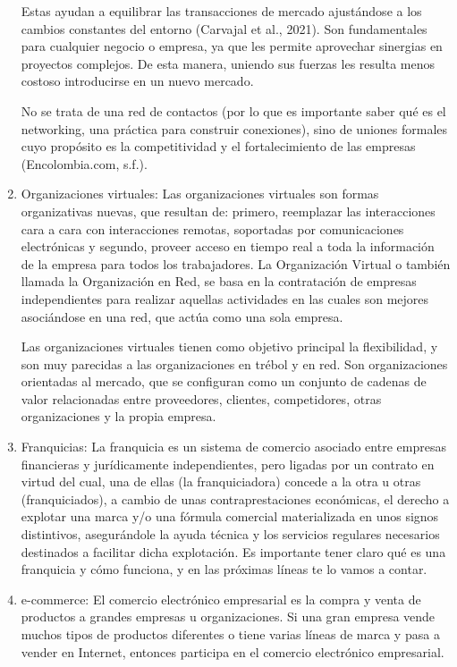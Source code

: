 \documentclass[letterpaper,12pt]{article}
\begin{document}
\begin{sloppypar}
\begin{enumerate}
    Estas ayudan a equilibrar las transacciones de mercado ajustándose a los cambios constantes del entorno (Carvajal et al., 2021). Son fundamentales para cualquier negocio o empresa, ya que les permite aprovechar sinergias en proyectos complejos. De esta manera, uniendo sus fuerzas les resulta menos costoso introducirse en un nuevo mercado. 
    
    No se trata de una red de contactos (por lo que es importante saber qué es el networking, una práctica para construir conexiones), sino de uniones formales cuyo propósito es la competitividad y el fortalecimiento de las empresas (Encolombia.com, s.f.).

    \item Organizaciones virtuales:  Las organizaciones virtuales son formas organizativas nuevas, que resultan de: primero,
    reemplazar las interacciones cara a cara con interacciones remotas, soportadas por
    comunicaciones electrónicas y segundo, proveer acceso en tiempo real a toda la información
    de la empresa para todos los trabajadores. La Organización Virtual o también llamada la Organización en Red, se basa en la contratación de empresas independientes para realizar aquellas actividades en las cuales son mejores asociándose en una red, que actúa como una sola empresa.

    Las organizaciones virtuales tienen como objetivo principal la flexibilidad, y son muy parecidas a las organizaciones en trébol y en red. Son organizaciones orientadas al mercado, que se configuran como un conjunto de cadenas de valor relacionadas entre proveedores, clientes, competidores, otras organizaciones y la propia empresa. 

    \item Franquicias: La franquicia es un sistema de comercio asociado entre empresas financieras y jurídicamente independientes, pero ligadas por un contrato en virtud del cual, una de ellas (la franquiciadora) concede a la otra u otras (franquiciados), a cambio de unas contraprestaciones económicas, el derecho a explotar una marca y/o una fórmula comercial materializada en unos signos distintivos, asegurándole la ayuda técnica y los servicios regulares necesarios destinados a facilitar dicha explotación. Es importante tener claro qué es una franquicia y cómo funciona, y en las próximas líneas te lo vamos a contar.
    
    \item e-commerce:  El comercio electrónico empresarial es la compra y venta de productos a grandes empresas u organizaciones. Si una gran empresa vende muchos tipos de productos diferentes o tiene varias líneas de marca y pasa a vender en Internet, entonces participa en el comercio electrónico empresarial.


\end{enumerate}
\end{sloppypar}
\end{document}
